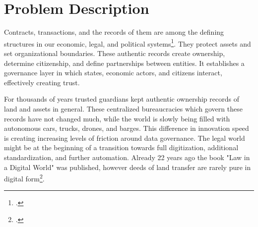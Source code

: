 \documentclass[USenglish]{article}
\begin{document}
\section{Problem Description}

Contracts, transactions, and the records of them are among the defining structures in our economic, legal, and political systems\footcite{harvardbusinessblockchain}.
They protect assets and set organizational boundaries.
These authentic records create ownership, determine citizenship, and define partnerships between entities.
It establishes a governance layer in which states, economic actors, and citizens interact, effectively creating trust.

For thousands of years trusted guardians kept authentic ownership records of land and assets in general.
These centralized bureaucracies which govern these records have not changed much, while the world is slowly being filled with autonomous cars, trucks, drones, and barges. 
This difference in innovation speed is creating increasing levels of friction around data governance. 
The legal world might be at the beginning of a transition towards full digitization, additional standardization, and further automation. 
Already 22 years ago the book "Law in a Digital World" was published, however deeds of land transfer are rarely pure in digital form\footcite{katsh1995law}.
\end{document}
